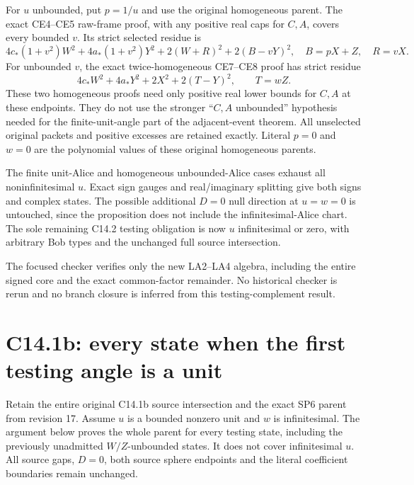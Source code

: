 For $u$ unbounded, put $p=1/u$ and use the original homogeneous
parent.  The exact CE4--CE5 raw-frame proof, with any positive real
caps for $C,A$, covers every bounded $v$.  Its strict selected
residue is
\[
 4c_*(1+v^2)W^2+4a_*(1+v^2)Y^2
                      +2(W+R)^2+2(B-vY)^2,
 \quad B=pX+Z,\quad R=vX.                         \tag{LA6}
\]
For unbounded $v$, the exact twice-homogeneous CE7--CE8 proof has
strict residue
\[
 4c_*W^2+4a_*Y^2+2X^2+2(T-Y)^2,
 \qquad T=wZ.                                    \tag{LA7}
\]
These two homogeneous proofs need only positive real lower bounds
for $C,A$ at these endpoints.  They do not use the stronger
``$C,A$ unbounded'' hypothesis needed for the finite-unit-angle part
of the adjacent-event theorem.  All unselected original packets and
positive excesses are retained exactly.  Literal $p=0$ and $w=0$
are the polynomial values of these original homogeneous parents.

The finite unit-Alice and homogeneous unbounded-Alice cases exhaust
all noninfinitesimal $u$.  Exact sign gauges and real/imaginary splitting
give both signs and complex states.  The possible additional $D=0$
null direction at $u=w=0$ is untouched, since the proposition does
not include the infinitesimal-Alice chart.  The sole remaining C14.2
testing obligation is now $u$ infinitesimal or zero, with arbitrary
Bob types and the unchanged full source intersection.

The focused checker verifies only the new LA2--LA4 algebra, including
the entire signed core and the exact common-factor remainder.  No
historical checker is rerun and no branch closure is inferred from
this testing-complement result.


\section{\texorpdfstring{C14.1b: every state when the first testing angle is a unit}{C14.1b: every state when the first testing angle is a unit}}
\label{component:pcc84202479d2}

\label{pcc84202479d2:sec:r18-sphere-unit-u}

Retain the entire original C14.1b source intersection and the exact
SP6 parent from revision 17.  Assume $u$ is a bounded nonzero unit
and $w$ is infinitesimal.  The argument below proves the whole parent
for every testing state, including the previously unadmitted
$W/Z$-unbounded states.  It does not cover infinitesimal $u$.
All source gaps, $D=0$, both source sphere endpoints and the literal
coefficient boundaries remain unchanged.

